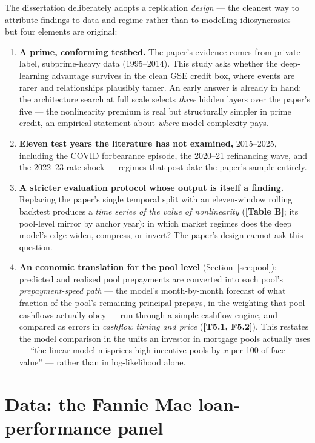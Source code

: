 \documentclass[11pt,a4paper]{article}
\newcommand{\artifact}[1]{\textbf{[#1]}}
\begin{document}
The dissertation deliberately adopts a replication \emph{design} --- the cleanest way to attribute findings to data and regime rather than to modelling idiosyncrasies --- but four elements are original:

\begin{enumerate}[itemsep=2pt]
\item \textbf{A prime, conforming testbed.} The paper's evidence comes from private-label, subprime-heavy data (1995--2014). This study asks whether the deep-learning advantage survives in the clean GSE credit box, where events are rarer and relationships plausibly tamer. An early answer is already in hand: the architecture search at full scale selects \emph{three} hidden layers over the paper's five --- the nonlinearity premium is real but structurally simpler in prime credit, an empirical statement about \emph{where} model complexity pays.
\item \textbf{Eleven test years the literature has not examined,} 2015--2025, including the COVID forbearance episode, the 2020--21 refinancing wave, and the 2022--23 rate shock --- regimes that post-date the paper's sample entirely.
\item \textbf{A stricter evaluation protocol whose output is itself a finding.} Replacing the paper's single temporal split with an eleven-window rolling backtest produces a \emph{time series of the value of nonlinearity} (\artifact{Table B}; its pool-level mirror by anchor year): in which market regimes does the deep model's edge widen, compress, or invert? The paper's design cannot ask this question.
\item \textbf{An economic translation for the pool level} (Section~\ref{sec:pool}): predicted and realised pool prepayments are converted into each pool's \emph{prepayment-speed path} --- the model's month-by-month forecast of what fraction of the pool's remaining principal prepays, in the weighting that pool cashflows actually obey --- run through a simple cashflow engine, and compared as errors in \emph{cashflow timing and price} (\artifact{T5.1, F5.2}). This restates the model comparison in the units an investor in mortgage pools actually uses --- ``the linear model misprices high-incentive pools by $x$ per 100 of face value'' --- rather than in log-likelihood alone.
\end{enumerate}

\section{Data: the Fannie Mae loan-performance panel}\label{sec:data}
\end{document}
